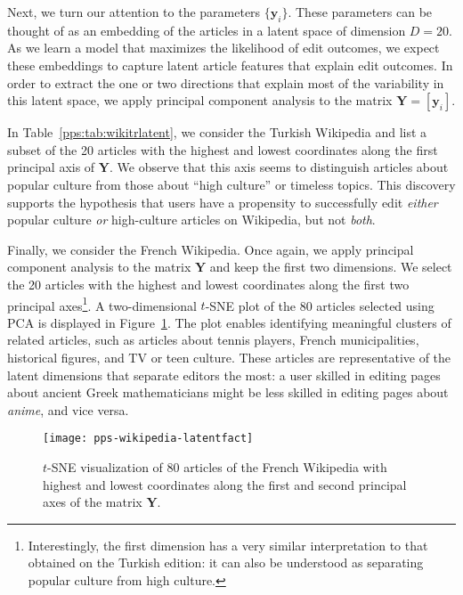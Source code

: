 Next, we turn our attention to the parameters $\{ \bm{y}_i \}$.
These parameters can be thought of as an embedding of the articles in a latent space of dimension $D = 20$.
As we learn a model that maximizes the likelihood of edit outcomes, we expect these embeddings to capture latent article features that explain edit outcomes.
In order to extract the one or two directions that explain most of the variability in this latent space, we apply principal component analysis \citep{bishop2006pattern} to the matrix $\bm{Y} = [\bm{y}_i]$.

In Table~\ref{pps:tab:wikitrlatent}, we consider the Turkish Wikipedia and list a subset of the \num{20} articles with the highest and lowest coordinates along the first principal axis of $\bm{Y}$.
We observe that this axis seems to distinguish articles about popular culture from those about ``high culture'' or timeless topics.
This discovery supports the hypothesis that users have a propensity to successfully edit \emph{either} popular culture \emph{or} high-culture articles on Wikipedia, but not \emph{both}.

Finally, we consider the French Wikipedia.
Once again, we apply principal component analysis to the matrix $\bm{Y}$ and keep the first two dimensions.
We select the \num{20} articles with the highest and lowest coordinates along the first two principal axes\footnote{%
	Interestingly, the first dimension has a very similar interpretation to that obtained on the Turkish edition: it can also be understood as separating popular culture from high culture.}.
A two-dimensional $t$-SNE plot \citep{vandermaaten2008visualizing} of the 80 articles selected using PCA is displayed in Figure~\ref{pps:fig:wikifrlatent}.
The plot enables identifying meaningful clusters of related articles, such as articles about tennis players, French municipalities, historical figures, and TV or teen culture.
These articles are representative of the latent dimensions that separate editors the most:
a user skilled in editing pages about ancient Greek mathematicians might be less skilled in editing pages about \emph{anime}, and vice versa.

\begin{figure}
	\texttt{[image: pps-wikipedia-latentfact]}
	\caption{$t$-SNE visualization of 80 articles of the French Wikipedia with highest and lowest coordinates along the first and second principal axes of the matrix $\bm{Y}$.}
	\label{pps:fig:wikifrlatent}
\end{figure}
